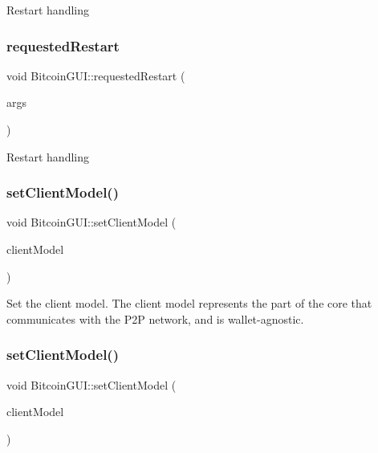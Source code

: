 Restart handling \mbox{\label{class_bitcoin_g_u_i_aa16b27ff0eab480255ba86b7d0486034}} 
\subsubsection{\texorpdfstring{requestedRestart}{requestedRestart}\hspace{0.1cm}{\footnotesize\ttfamily [2/2]}}
{\footnotesize\ttfamily void Bitcoin\+G\+U\+I\+::requested\+Restart (\begin{DoxyParamCaption}\item[{Q\+String\+List}]{args }\end{DoxyParamCaption})\hspace{0.3cm}{\ttfamily [signal]}}

Restart handling \mbox{\label{class_bitcoin_g_u_i_a99d71e1f8478ab937ce2522c8d3815e3}} 
\subsubsection{\texorpdfstring{setClientModel()}{setClientModel()}\hspace{0.1cm}{\footnotesize\ttfamily [1/2]}}
{\footnotesize\ttfamily void Bitcoin\+G\+U\+I\+::set\+Client\+Model (\begin{DoxyParamCaption}\item[{\mbox{\hyperlink{class_client_model}{Client\+Model}} $\ast$}]{client\+Model }\end{DoxyParamCaption})}

Set the client model. The client model represents the part of the core that communicates with the P2P network, and is wallet-\/agnostic. \mbox{\label{class_bitcoin_g_u_i_a99d71e1f8478ab937ce2522c8d3815e3}} 
\subsubsection{\texorpdfstring{setClientModel()}{setClientModel()}\hspace{0.1cm}{\footnotesize\ttfamily [2/2]}}
{\footnotesize\ttfamily void Bitcoin\+G\+U\+I\+::set\+Client\+Model (\begin{DoxyParamCaption}\item[{\mbox{\hyperlink{class_client_model}{Client\+Model}} $\ast$}]{client\+Model }\end{DoxyParamCaption})}

